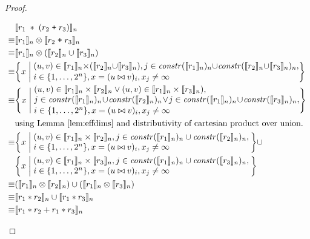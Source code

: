 \begin{proof}
\begin{description}
    \begin{align*}
             & \interp{r_1 \; \ast \; (r_2 \; \texttt{+} \; r_3)}_n \\
      \equiv & \interp{r_1}_n \otimes \interp{r_2 \; \texttt{+} \; r_3}_n \\
      \equiv & \interp{r_1}_n \otimes (\interp{r_2}_n \cup \interp{r_3}_n) \\
      \equiv &
  \bigg\{x \; \bigg| \;
    \parbox{11cm}{$(u, v) \in \interp{r_1}_n \times (\interp{r_2}_n \cup \interp{r_3}_n),
                   j \in \effdims{\interp{r_1}_n}{n} \cup
                         \effdims{\interp{r_2}_n \cup
                         \interp{r_3}_n}{n},$ \\[0.1em]
                  $i \in \{1, \ldots, 2^n\},
                   x = (u \bowtie v)_i, x_j \neq \infty$
                  } \bigg\} \\
      \equiv &
  \Bigg\{x \; \Bigg| \;
    \parbox{11cm}{$(u, v) \in \interp{r_1}_n \times \interp{r_2}_n \vee (u, v) \in \interp{r_1}_n \times \interp{r_3}_n), \\
                   j \in \effdims{\interp{r_1}_n}{n} \cup
                          \effdims{\interp{r_2}_n}{n} \vee
                    j \in \effdims{\interp{r_1}_n}{n} \cup
                          \effdims{\interp{r_3}_n}{n},$ \\ [0.1em]
                  $i \in \{1, \ldots, 2^n\},
                   x = (u \bowtie v)_i, x_j \neq \infty$
                  } \Bigg\} \\
             & \mbox{using Lemma~\ref{lem:effdims} and distributivity of cartesian product over union.} \\
      \equiv &
  \bigg\{x \; \bigg| \;
    \parbox{9cm}{$(u, v) \in \interp{r_1}_n \times \interp{r_2}_n,
                  j \in \effdims{\interp{r_1}_n}{n} \cup
                        \effdims{\interp{r_2}_n}{n},$ \\
                 $i \in \{1, \ldots, 2^n\},
                  x = (u \bowtie v)_i, x_j \neq \infty$
                  } \bigg\} \cup \\
  & \bigg\{x \; \bigg| \;
    \parbox{9cm}{$(u, v) \in \interp{r_1}_n \times \interp{r_3}_n,
                  j \in \effdims{\interp{r_1}_n}{n} \cup
                        \effdims{\interp{r_3}_n}{n},$ \\
                 $i \in \{1, \ldots, 2^n\},
                  x = (u \bowtie v)_i, x_j \neq \infty$
                  } \bigg\} \\
      \equiv & (\interp{r_1}_n \otimes \interp{r_2}_n)
        \cup (\interp{r_1}_n \otimes \interp{r_3}_n) \\
      \equiv & \interp{r_1 \ast r_2}_n \cup \interp{r_1 \ast r_3}_n \\
      \equiv & \interp{r_1 \ast r_2 + r_1 \ast r_3}_n \\
    \end{align*}
\end{description}
\end{proof}
